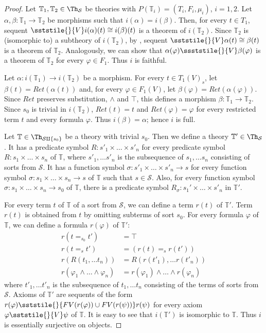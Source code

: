 \begin{proof}
Let $\mathbb{T}_1,\mathbb{T}_2 \in \Th_\mathcal{S}$ be theories with $P(\mathbb{T}_i) = (T_i,F_i,\mu_i)$, $i = 1,2$.
Let $\alpha,\beta : \mathbb{T}_1 \to \mathbb{T}_2$ be morphisms such that $i(\alpha) = i(\beta)$.
Then, for every $t \in T_1$, sequent $\sststile{}{V} i(\alpha)(t) \cong i(\beta)(t)$ is a theorem of $i(\mathbb{T}_2)$.
Since $\mathbb{T}_2$ is (isomorphic to) a subtheory of $i(\mathbb{T}_2)$, by , sequent $\sststile{}{V} \alpha(t) \cong \beta(t)$ is a theorem of $\mathbb{T}_2$.
Analogously, we can show that $\alpha(\varphi) \ssststile{}{V} \beta(\varphi)$ is a theorem of $\mathbb{T}_2$ for every $\varphi \in F_1$.
Thus $i$ is faithful.

Let $\alpha : i(\mathbb{T}_1) \to i(\mathbb{T}_2)$ be a morphism.
For every $t \in T_1(V)_s$, let $\beta(t) = Ret(\alpha(t))$ and, for every $\varphi \in F_1(V)$, let $\beta(\varphi) = Ret(\alpha(\varphi))$.
Since $Ret$ preserves substitution, $\land$ and $\top$, this defines a morphism $\beta : \mathbb{T}_1 \to \mathbb{T}_2$.
Since $s_0$ is trivial in $i(\mathbb{T}_2)$, $Ret(t) = t$ and $Ret(\varphi) = \varphi$ for every restricted term $t$ and every formula $\varphi$.
Thus $i(\beta) = \alpha$; hence $i$ is full.

Let $\mathbb{T} \in \Th_{\mathcal{S} \amalg \{ s_0 \}}$ be a theory with trivial $s_0$.
Then we define a theory $\mathbb{T}' \in \Th_\mathcal{S}$.
It has a predicate symbol $R : s'_1 \times \ldots \times s'_n$ for every predicate symbol $R : s_1 \times \ldots \times s_n$ of $\mathbb{T}$,
    where $s'_1, \ldots s'_n$ is the subsequence of $s_1, \ldots s_n$ consisting of sorts from $\mathcal{S}$.
It has a function symbol $\sigma : s'_1 \times \ldots \times s'_n \to s$ for every function symbol
    $\sigma : s_1 \times \ldots \times s_n \to s$ of $\mathbb{T}$ such that $s \in \mathcal{S}$.
Also, for every function symbol $\sigma : s_1 \times \ldots \times s_n \to s_0$ of $\mathbb{T}$,
    there is a predicate symbol $R_\sigma : s_1' \times \ldots \times s'_n$ in $\mathbb{T}'$.

For every term $t$ of $\mathbb{T}$ of a sort from $\mathcal{S}$, we can define a term $r(t)$ of $\mathbb{T}'$.
Term $r(t)$ is obtained from $t$ by omitting subterms of sort $s_0$.
For every formula $\varphi$ of $\mathbb{T}$, we can define a formula $r(\varphi)$ of $\mathbb{T}'$:
\begin{align*}
r(t =_{s_0} t') & = \top \\
r(t =_s t') & = (r(t) =_s r(t')) \\
r(R(t_1, \ldots t_n)) & = R(r(t'_1), \ldots r(t'_n)) \\
r(\varphi_1 \land \ldots \land \varphi_n) & = r(\varphi_1) \land \ldots \land r(\varphi_n)
\end{align*}
where $t'_1, \ldots t'_n$ is the subsequence of $t_1, \ldots t_n$ consisting of the terms of sorts from $\mathcal{S}$.
Axioms of $\mathbb{T}'$ are sequents of the form $r(\varphi) \sststile{}{FV(r(\varphi)) \cup FV(r(\psi))} r(\psi)$ for every axiom $\varphi \sststile{}{V} \psi$ of $\mathbb{T}$.
It is easy to see that $i(\mathbb{T}')$ is isomorphic to $\mathbb{T}$.
Thus $i$ is essentially surjective on objects.
\end{proof}

